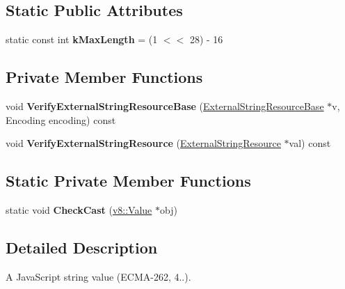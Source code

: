 \subsection*{Static Public Attributes}
\begin{DoxyCompactItemize}
\item 
static const int {\bfseries k\+Max\+Length} = (1 $<$$<$ 28) -\/ 16\hypertarget{classv8_1_1_string_a51272e8a71006385863586afb2bb4a62}{}\label{classv8_1_1_string_a51272e8a71006385863586afb2bb4a62}

\end{DoxyCompactItemize}
\subsection*{Private Member Functions}
\begin{DoxyCompactItemize}
\item 
void {\bfseries Verify\+External\+String\+Resource\+Base} (\hyperlink{classv8_1_1_string_1_1_external_string_resource_base}{External\+String\+Resource\+Base} $\ast$v, Encoding encoding) const \hypertarget{classv8_1_1_string_a71db8b67a4af9f37664171272644ccc1}{}\label{classv8_1_1_string_a71db8b67a4af9f37664171272644ccc1}

\item 
void {\bfseries Verify\+External\+String\+Resource} (\hyperlink{classv8_1_1_string_1_1_external_string_resource}{External\+String\+Resource} $\ast$val) const \hypertarget{classv8_1_1_string_a9322ad76d54c0f4f6d276a146535354a}{}\label{classv8_1_1_string_a9322ad76d54c0f4f6d276a146535354a}

\end{DoxyCompactItemize}
\subsection*{Static Private Member Functions}
\begin{DoxyCompactItemize}
\item 
static void {\bfseries Check\+Cast} (\hyperlink{classv8_1_1_value}{v8\+::\+Value} $\ast$obj)\hypertarget{classv8_1_1_string_ab34939f732637d3ded13ae2a4267bc29}{}\label{classv8_1_1_string_ab34939f732637d3ded13ae2a4267bc29}

\end{DoxyCompactItemize}


\subsection{Detailed Description}
A Java\+Script string value (E\+C\+M\+A-\/262, 4..). 

